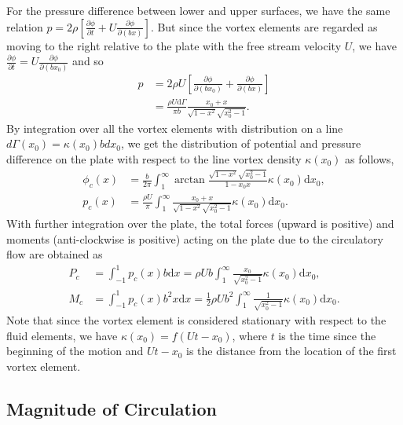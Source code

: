 For the pressure difference between lower and upper surfaces, we have the same relation $p = 2 \rho[\frac{\partial \phi}{\partial t} + U\frac{\partial \phi}{\partial (bx)}]$.
But since the vortex elements are regarded as moving to the right relative to the plate with the free stream velocity $U$,  we have $\frac{\partial \phi}{\partial t} = U\frac{\partial \phi}{\partial (bx_0)}$ and so 
\begin{align}
p & = 2\rho U [\frac{\partial \phi}{\partial (bx_0)} + \frac{\partial \phi}{\partial (bx)}]  \\
   & =  \frac{\rho U \mathrm{d}\Gamma}{\pi b} \frac{x_0+x}{\sqrt{1-x^2}\sqrt{x_0^2-1}}.
\end{align}
By integration over all the vortex elements with distribution on a line $d\Gamma(x_0) = \kappa(x_0)bdx_0$, we get the distribution of potential and pressure difference on the plate with respect to the line vortex density $\kappa(x_0)$ as follows,
\begin{align}
\phi_c(x) & =  \frac{b}{2\pi} \int_{1}^{\infty}\arctan \frac{\sqrt{1-x^2}\sqrt{x_0^2-1}}{1-x_0x} \kappa(x_0) \mathrm{d}x_0, \\
p_c(x) &  =  \frac{\rho U}{\pi} \int_{1}^{\infty}\frac{x_0+x}{\sqrt{1-x^2}\sqrt{x_0^2-1}} \kappa(x_0) \mathrm{d}x_0.
\end{align}
With further integration over the plate, the total forces (upward is positive) and moments (anti-clockwise is positive) acting on the plate due to the circulatory flow are obtained as
\begin{align}
P_c & =  \int_{-1}^{1} p_c (x) b \mathrm{d}x
   =  \rho U b \int_{1}^{\infty} \frac{x_0}{\sqrt{x_0^2-1}} \kappa(x_0) \mathrm{d}x_0, \\
M_c & =  \int_{-1}^{1} p_c (x) b^2 x \mathrm{d}x
   =   \frac{1}{2} \rho U b^2 \int_{1}^{\infty} \frac{1}{\sqrt{x_0^2-1}} \kappa(x_0) \mathrm{d}x_0.
\end{align}
Note that since the vortex element is considered stationary with respect to the fluid elements, we have $\kappa (x_0) = f(Ut - x_0)$, where $t$ is the time since the beginning of the motion and $Ut-x_0$ is the distance from the location of the first vortex element.


\subsection{Magnitude of Circulation}

